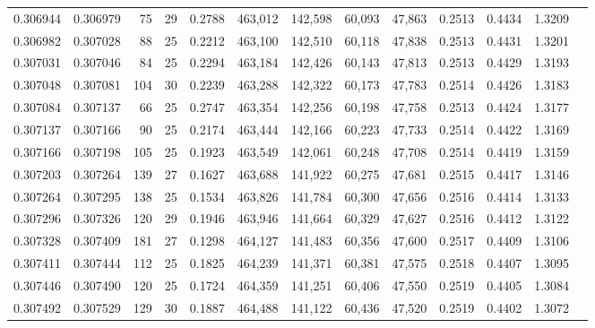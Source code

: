 \begin{tabular}{rrrrrrrrrrrrr}
0.306944 & 0.306979 &    75 &  29 &                                     0.2788 & 463,012 & 142,598 &  60,093 &  47,863 & 0.2513 & 0.4434 & 1.3209 \\
0.306982 & 0.307028 &    88 &  25 &                                     0.2212 & 463,100 & 142,510 &  60,118 &  47,838 & 0.2513 & 0.4431 & 1.3201 \\
0.307031 & 0.307046 &    84 &  25 &                                     0.2294 & 463,184 & 142,426 &  60,143 &  47,813 & 0.2513 & 0.4429 & 1.3193 \\
0.307048 & 0.307081 &   104 &  30 &                                     0.2239 & 463,288 & 142,322 &  60,173 &  47,783 & 0.2514 & 0.4426 & 1.3183 \\
0.307084 & 0.307137 &    66 &  25 &                                     0.2747 & 463,354 & 142,256 &  60,198 &  47,758 & 0.2513 & 0.4424 & 1.3177 \\
0.307137 & 0.307166 &    90 &  25 &                                     0.2174 & 463,444 & 142,166 &  60,223 &  47,733 & 0.2514 & 0.4422 & 1.3169 \\
0.307166 & 0.307198 &   105 &  25 &                                     0.1923 & 463,549 & 142,061 &  60,248 &  47,708 & 0.2514 & 0.4419 & 1.3159 \\
0.307203 & 0.307264 &   139 &  27 &                                     0.1627 & 463,688 & 141,922 &  60,275 &  47,681 & 0.2515 & 0.4417 & 1.3146 \\
0.307264 & 0.307295 &   138 &  25 &                                     0.1534 & 463,826 & 141,784 &  60,300 &  47,656 & 0.2516 & 0.4414 & 1.3133 \\
0.307296 & 0.307326 &   120 &  29 &                                     0.1946 & 463,946 & 141,664 &  60,329 &  47,627 & 0.2516 & 0.4412 & 1.3122 \\
0.307328 & 0.307409 &   181 &  27 &                                     0.1298 & 464,127 & 141,483 &  60,356 &  47,600 & 0.2517 & 0.4409 & 1.3106 \\
0.307411 & 0.307444 &   112 &  25 &                                     0.1825 & 464,239 & 141,371 &  60,381 &  47,575 & 0.2518 & 0.4407 & 1.3095 \\
0.307446 & 0.307490 &   120 &  25 &                                     0.1724 & 464,359 & 141,251 &  60,406 &  47,550 & 0.2519 & 0.4405 & 1.3084 \\
0.307492 & 0.307529 &   129 &  30 &                                     0.1887 & 464,488 & 141,122 &  60,436 &  47,520 & 0.2519 & 0.4402 & 1.3072 \\

\end{tabular}
